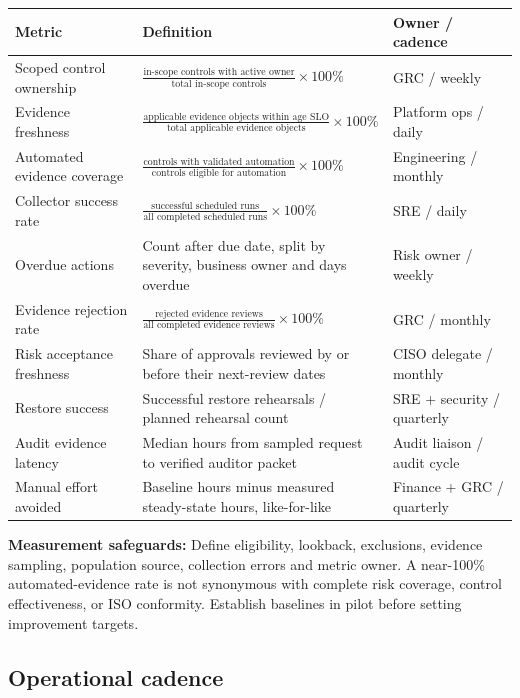 \documentclass[10pt,letterpaper]{article}
\begin{document}
\begin{longtable}{@{}L{1.61in}L{2.48in}L{2.00in}@{}}
\toprule
\textbf{Metric} & \textbf{Definition} & \textbf{Owner / cadence}\\\midrule\endhead
Scoped control ownership & $\frac{\text{in-scope controls with active owner}}{\text{total in-scope controls}}\times100\%$ & GRC / weekly\\
Evidence freshness & $\frac{\text{applicable evidence objects within age SLO}}{\text{total applicable evidence objects}}\times100\%$ & Platform ops / daily\\
Automated evidence coverage & $\frac{\text{controls with validated automation}}{\text{controls eligible for automation}}\times100\%$ & Engineering / monthly\\
Collector success rate & $\frac{\text{successful scheduled runs}}{\text{all completed scheduled runs}}\times100\%$ & SRE / daily\\
Overdue actions & Count after due date, split by severity, business owner and days overdue & Risk owner / weekly\\
Evidence rejection rate & $\frac{\text{rejected evidence reviews}}{\text{all completed evidence reviews}}\times100\%$ & GRC / monthly\\
Risk acceptance freshness & Share of approvals reviewed by or before their next-review dates & CISO delegate / monthly\\
Restore success & Successful restore rehearsals / planned rehearsal count & SRE + security / quarterly\\
Audit evidence latency & Median hours from sampled request to verified auditor packet & Audit liaison / audit cycle\\
Manual effort avoided & Baseline hours minus measured steady-state hours, like-for-like & Finance + GRC / quarterly\\
\bottomrule
\end{longtable}
\normalsize
\textbf{Measurement safeguards:} Define eligibility, lookback, exclusions, evidence sampling, population source, collection errors and metric owner. A near-100\% automated-evidence rate is not synonymous with complete risk coverage, control effectiveness, or ISO conformity. Establish baselines in pilot before setting improvement targets.

\subsection{Operational cadence}
\end{document}
